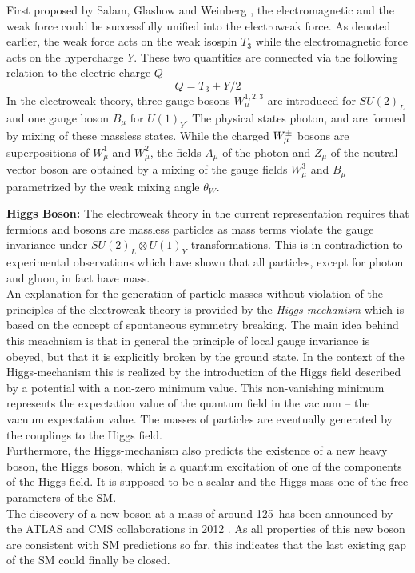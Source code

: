 \begin{description}
\begin{description}
 \end{description}
First proposed by Salam, Glashow and Weinberg , the electromagnetic and the weak force could be successfully unified into the electroweak force. As denoted earlier, the weak force acts on the weak isospin $T_{3}$ while the electromagnetic force acts on the hypercharge $Y$. These two quantities are connected via the following relation to the electric charge $Q$
\begin{equation*}
Q = T_{3} + Y/2
\end{equation*}
In the electroweak theory, three gauge bosons $W^{1,2,3}_{\mu}$ are introduced for $SU(2)_{L}$ and one gauge boson $B_{\mu}$ for $U(1)_{Y}$. The physical states photon, \Wpm and \Z are formed by mixing of these massless states. While the charged $W^{\pm}_{\mu}$ bosons are superpositions of $W^{1}_{\mu}$ and $W^{2}_{\mu}$, the fields $A_{\mu}$ of the photon and $Z_{\mu}$ of the neutral vector boson are obtained by a mixing of the gauge fields $W^{3}_{\mu}$ and $B_{\mu}$ parametrized by the weak mixing angle $\theta_{W}$.  
\item \textbf{Higgs Boson:} The electroweak theory in the current representation requires that fermions and bosons are massless particles as mass terms violate the gauge invariance under $SU(2)_{L} \otimes U(1)_{Y}$ transformations. This is in contradiction to experimental observations which have shown that all particles, except for photon and gluon, in fact have mass. \\
An explanation for the generation of particle masses without violation of the principles of the electroweak theory is provided by the \textit{Higgs-mechanism}  which is based on the concept of spontaneous symmetry breaking. The main idea behind this meachnism is that in general the principle of local gauge invariance is obeyed, but that it is explicitly broken by the ground state. In the context of the Higgs-mechanism this is realized by the introduction of the Higgs field described by a potential with a non-zero minimum value. This non-vanishing minimum represents the expectation value of the quantum field in the vacuum -- the vacuum expectation value. The masses of particles are eventually generated by the couplings to the Higgs field. \\
Furthermore, the Higgs-mechanism also predicts the existence of a new heavy boson, the Higgs boson, which is a quantum excitation of one of the components of the Higgs field. It is supposed to be a scalar and the Higgs mass one of the free parameters of the SM. \\
The discovery of a new boson at a mass of around 125~\gev has been announced by the ATLAS and CMS collaborations in 2012 . As all properties of this new boson are consistent with SM predictions so far, this indicates that the last existing gap of the SM could finally be closed. 
\end{description}

